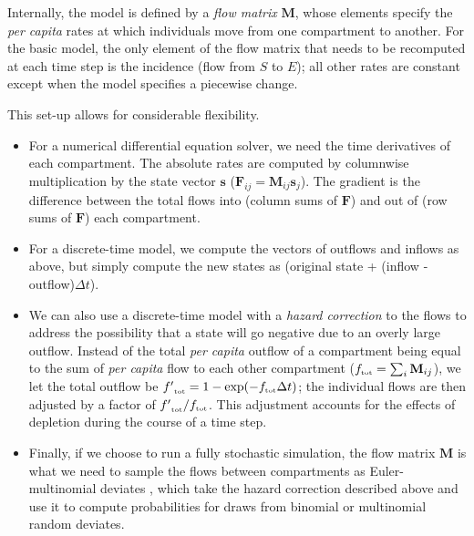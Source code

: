 \documentclass[12pt]{article}\usepackage[]{graphicx}\usepackage[]{color}
\begin{document}

Internally, the model is defined by a \emph{flow matrix} $\mathbf{M}$, whose elements specify the \emph{per capita} rates at which individuals move from one compartment to another.
For the basic model, the only element of the flow matrix that needs to be recomputed at each time step is the incidence (flow from $S$ to $E$); all other rates are constant except when the model specifies a piecewise change.

This set-up allows for considerable flexibility.
\begin{itemize}
\item For a numerical differential equation solver, we need the time derivatives of each compartment. The absolute rates are computed by columnwise multiplication by the state vector $\mathbf s$ (${\mathbf F}_{ij} = \mathbf{M}_{ij} \mathbf{s}_j$).
The gradient is the difference between the total flows into (column sums of $\mathbf F$) and out of (row sums of $\mathbf F$) each compartment.
\item For a discrete-time model, we compute the vectors of outflows and inflows as above, but simply compute the new states as (original state + (inflow - outflow)$\Delta t$).
\item We can also use a discrete-time model with a \emph{hazard correction} to the flows to address the possibility that a state will go negative due to an overly large outflow. Instead of the total \emph{per capita} outflow of a compartment being equal to the sum of \emph{per capita} flow to each other compartment (${{f}_{\textrm{\tiny tot}}} = \sum_i {\mathbf M}_{ij}$), we let the total outflow be ${{f'}_{\textrm{\tiny tot}}} = 1-\exp(-{{f}_{\textrm{\tiny tot}}} \Delta t)$; the individual flows are then adjusted by a factor of ${{f'}_{\textrm{\tiny tot}}}/{{f}_{\textrm{\tiny tot}}}$.
This adjustment accounts for the effects of depletion during the course of a time step.
\item Finally, if we choose to run a fully stochastic simulation, the flow matrix $\mathbf M$ is what we need to sample the flows between compartments as Euler-multinomial deviates \cite{breto+09}, which take the hazard correction described above and use it to compute probabilities for draws from binomial or multinomial random deviates.
\end{itemize}
\end{document}
